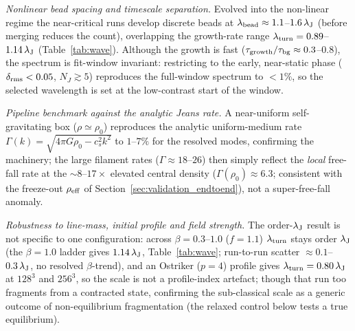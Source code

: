 \documentclass[usenatbib,twoside,twocolumn]{mnras}
\begin{document}
\emph{Nonlinear bead spacing and timescale separation.} Evolved into the non-linear regime the near-critical runs develop discrete beads at $\lambda_{\rm bead}\approx1.1$--$1.6\,\lambda_{\rm J}$ (before merging reduces the count), overlapping the growth-rate range $\lambda_{\rm turn}=0.89$--$1.14\,\lambda_{\rm J}$ (Table~\ref{tab:wave}). Although the growth is fast ($\tau_{\rm growth}/\tau_{\rm bg}\approx0.3$--$0.8$), the spectrum is fit-window invariant: restricting to the early, near-static phase ($\delta_{\rm rms}<0.05$, $N_J\gtrsim5$) reproduces the full-window spectrum to $<1\%$, so the selected wavelength is set at the low-contrast start of the window.

\emph{Pipeline benchmark against the analytic Jeans rate.} A near-uniform self-gravitating box ($\rho\simeq\rho_0$) reproduces the analytic uniform-medium rate $\Gamma(k)=\sqrt{4\pi G\rho_0-c_s^2k^2}$ to $1$--$7\%$ for the resolved modes, confirming the machinery; the large filament rates ($\Gamma\approx18$--$26$) then simply reflect the \emph{local} free-fall rate at the $\sim8$--$17\times$ elevated central density ($\Gamma(\rho_0)\approx6.3$; consistent with the freeze-out $\rho_{\rm eff}$ of Section~\ref{sec:validation_endtoend}), not a super-free-fall anomaly.

\emph{Robustness to line-mass, initial profile and field strength.} The order-$\lambda_{\rm J}$ result is not specific to one configuration: across $\beta=0.3$--$1.0$ ($f=1.1$) $\lambda_{\rm turn}$ stays order $\lambda_{\rm J}$ (the $\beta=1.0$ ladder gives $1.14\,\lambda_{\rm J}$, Table~\ref{tab:wave}; run-to-run scatter $\approx0.1$--$0.3\,\lambda_{\rm J}$, no resolved $\beta$-trend), and an Ostriker ($p=4$) profile gives $\lambda_{\rm turn}=0.80\,\lambda_{\rm J}$ at $128^3$ and $256^3$, so the scale is not a profile-index artefact; though that run too fragments from a contracted state, confirming the sub-classical scale as a generic outcome of non-equilibrium fragmentation (the relaxed control below tests a true equilibrium).
\end{document}
